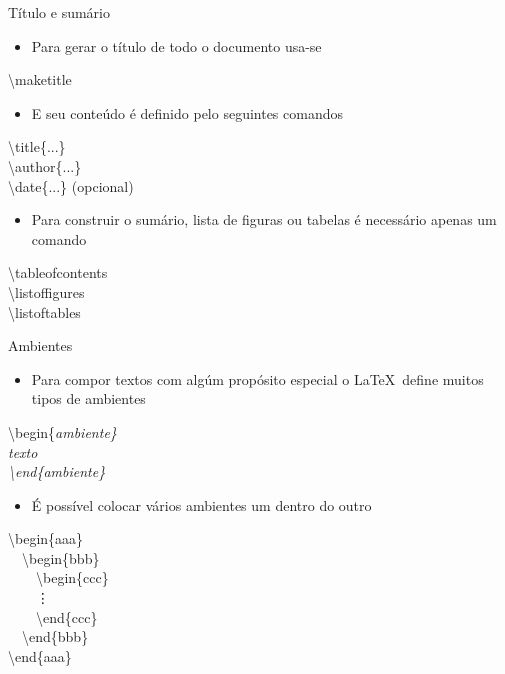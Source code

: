 \documentclass{beamer}
\begin{document}
\begin{frame}{Título e sumário}
    \begin{itemize}
    \item Para gerar o título de todo o documento usa-se
    \end{itemize}

   \alert{\textbackslash maketitle}

    \begin{itemize}
    \item E seu conteúdo é definido pelo seguintes comandos
    \end{itemize}

    \alert{\textbackslash title\{...\}} \\
    \alert{\textbackslash author\{...\}} \\
    \alert{\textbackslash date\{...\}} {\small (opcional)}

    \begin{itemize}
    \item Para construir o sumário, lista de figuras ou tabelas é necessário apenas um comando
    \end{itemize}
    
    \alert{\textbackslash tableofcontents \\
           \textbackslash listoffigures \\
           \textbackslash listoftables
        }

\end{frame}

\begin{frame}{Ambientes}
    \begin{itemize}
    \item Para compor textos com algúm propósito especial o \LaTeX\ define muitos tipos de ambientes
    \end{itemize}

    \alert{\textbackslash begin\{\it ambiente\} \\
           \textit{texto} \\
           \textbackslash end\{\it ambiente\}}

    \begin{itemize}
    \item É possível colocar vários ambientes um dentro do outro
    \end{itemize}

    \alert{\small
    \textbackslash begin\{aaa\} \\
    \ \ \textbackslash begin\{bbb\} \\
    \ \ \ \ \textbackslash begin\{ccc\} \\
    \ \ \ \ \vdots \\
    \ \ \ \ \textbackslash end\{ccc\} \\
    \ \ \textbackslash end\{bbb\} \\
    \textbackslash end\{aaa\}
    }
\end{frame}
\end{document}
